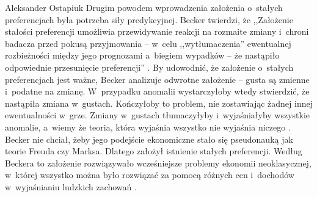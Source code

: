 \begin{artplenv}{Aleksander Ostapiuk}
Drugim powodem wprowadzenia założenia o~stałych preferencjach była potrzeba siły predykcyjnej. Becker twierdzi, że
,,Założenie stałości preferencji umożliwia przewidywanie reakcji na rozmaite zmiany i~chroni badacza przed pokusą
przyjmowania -- w~celu ,,wytłumaczenia'' ewentualnej rozbieżności między jego prognozami a~biegiem wypadków -- że
nastąpiło odpowiednie przesunięcie preferencji''
\parencite[s.~23]{becker_ekonomiczna_1990}.
By udowodnić, że
założenie o~stałych preferencjach jest ważne, Becker analizuje odwrotne założenie -- gusta są zmienne i~podatne na
zmianę. W~przypadku anomalii wystarczyłoby wtedy stwierdzić, że nastąpiła zmiana w~gustach. Kończyłoby to problem, nie
zostawiając żadnej innej ewentualności w~grze. Zmiany w~gustach tłumaczyłyby i~wyjaśniałyby wszystkie anomalie, a~wiemy
że teoria, która wyjaśnia wszystko nie wyjaśnia niczego
\parencite{popper_logic_1959}.
Becker nie chciał,
żeby jego podejście ekonomiczne stało się pseudonauką jak teorie Freuda czy Marksa. Dlatego założył istnienie stałych
preferencji. Według Beckera to założenie rozwiązywało wcześniejsze problemy ekonomii neoklasycznej, w~której wszystko
można było rozwiązać za pomocą różnych cen i~dochodów w~wyjaśnianiu ludzkich zachowań
\parencite{becker_gustibus_1977}.


\end{artplenv}
